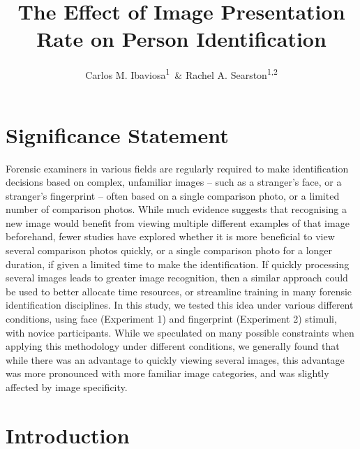 \documentclass[
  english,
  man]{apa6}
\author{Carlos M. Ibaviosa\textsuperscript{1}\ \& Rachel A. Searston\textsuperscript{1,2}}
\affiliation{
\vspace{0.5cm}
\textsuperscript{1} University of Adelaide\\\textsuperscript{2} University of Adelaide}
\title{The Effect of Image Presentation Rate on Person Identification}
\date{}
\newenvironment{Shaded}{\begin{snugshade}}{\end{snugshade}}
\newcommand{\CommentTok}[1]{\textcolor[rgb]{0.56,0.35,0.01}{\textit{#1}}}
\newcommand{\DataTypeTok}[1]{\textcolor[rgb]{0.13,0.29,0.53}{#1}}
\newcommand{\DecValTok}[1]{\textcolor[rgb]{0.00,0.00,0.81}{#1}}
\newcommand{\KeywordTok}[1]{\textcolor[rgb]{0.13,0.29,0.53}{\textbf{#1}}}
\newcommand{\NormalTok}[1]{#1}
\newcommand{\OperatorTok}[1]{\textcolor[rgb]{0.81,0.36,0.00}{\textbf{#1}}}
\begin{document}
\maketitle

\tableofcontents
\newpage

\begin{Shaded}
\end{Shaded}

\hypertarget{significance-statement}{%
\section{Significance Statement}\label{significance-statement}}

Forensic examiners in various fields are regularly required to make identification decisions based on complex, unfamiliar images -- such as a stranger's face, or a stranger's fingerprint -- often based on a single comparison photo, or a limited number of comparison photos. While much evidence suggests that recognising a new image would benefit from viewing multiple different examples of that image beforehand, fewer studies have explored whether it is more beneficial to view several comparison photos quickly, or a single comparison photo for a longer duration, if given a limited time to make the identification. If quickly processing several images leads to greater image recognition, then a similar approach could be used to better allocate time resources, or streamline training in many forensic identification disciplines. In this study, we tested this idea under various different conditions, using face (Experiment 1) and fingerprint (Experiment 2) stimuli, with novice participants. While we speculated on many possible constraints when applying this methodology under different conditions, we generally found that while there was an advantage to quickly viewing several images, this advantage was more pronounced with more familiar image categories, and was slightly affected by image specificity.

\hypertarget{introduction}{%
\section{Introduction}\label{introduction}}
\end{document}
